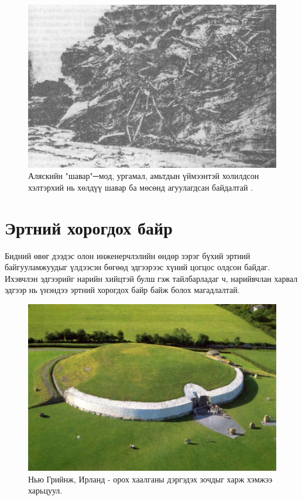 \documentclass[10pt,twocolumn,letterpaper]{article}
\begin{document}
\begin{figure}[t]
\begin{center}
   \includegraphics[width=1\linewidth]{muck-crop.jpeg}
\end{center}
   \caption{Аляскийн "шавар"─мод, ургамал, амьтдын үймээнтэй холилдсон хэлтэрхий нь хөлдүү шавар ба мөсөнд агуулагдсан байдалтай \cite{146}.}
\label{fig:7}
\label{fig:onecol}
\end{figure}
\section{Эртний хорогдох байр}

Бидний өвөг дээдэс олон инженерчлэлийн өндөр зэрэг бүхий эртний байгууламжуудыг үлдээсэн бөгөөд эдгээрээс хүний цогцос олдсон байдаг. Ихэвчлэн эдгээрийг нарийн хийцтэй булш гэж тайлбарладаг ч, нарийвчлан харвал эдгээр нь үнэндээ эртний хорогдох байр байж болох магадлалтай.

\begin{figure}[b]
\begin{center}
   \includegraphics[width=1\linewidth]{ww19.jpg}
\end{center}
   \caption{Нью Грийнж, Ирланд - орох хаалганы дэргэдэх зочдыг харж хэмжээ харьцуул.}
\label{fig:8}
\label{fig:onecol}
\end{figure}
\end{document}
